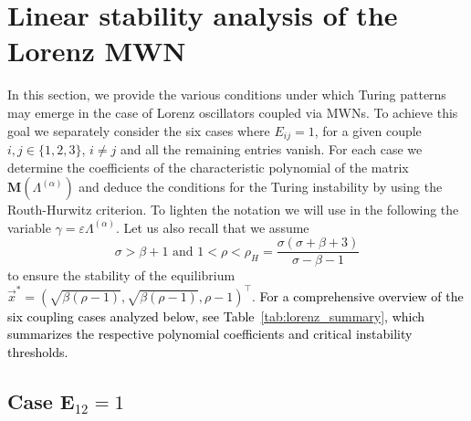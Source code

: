 \documentclass[aps,showpacs,preprintnumbers,amsmath,amssymb,twocolumn,superscriptaddress,floatfix,nofootinbib,10pt,pre]{revtex4-1}
\begin{document}
\section{Linear stability analysis of the Lorenz MWN}\label{app:lorenz}

In this section, we provide the various conditions under which Turing patterns may emerge in the case of Lorenz oscillators coupled via MWNs. To achieve this goal we separately consider the six cases where $E_{ij}=1$, for a given couple $i,j\in\{1,2,3\}$, $i\neq j$ and all the remaining entries vanish. For each case we determine  the coefficients of the characteristic polynomial of the matrix $\mathbf{M}(\Lambda^{(\alpha)})$ and deduce the conditions for the Turing instability by using the Routh-Hurwitz criterion. To lighten the notation we will use in the following the variable $\gamma=\varepsilon \Lambda^{(\alpha)}$. Let us also recall that we assume
\begin{equation}
\label{eq:stabcondLor}
    \sigma>\beta+1 \text{ and }1<\rho<\rho_H=\frac{\sigma(\sigma+\beta+3)}{\sigma-\beta-1}
\end{equation}
to ensure the stability of the equilibrium $\vec{x}^*=(\sqrt{\beta(\rho-1)},\sqrt{\beta(\rho-1)},\rho-1)^\top$. \textcolor{black}{For a comprehensive overview of the six coupling cases analyzed below, see Table~\ref{tab:lorenz_summary}, which summarizes the respective polynomial coefficients and critical instability thresholds.}

\subsection{Case $\mathbf{E}_{12}=1$}
\end{document}
